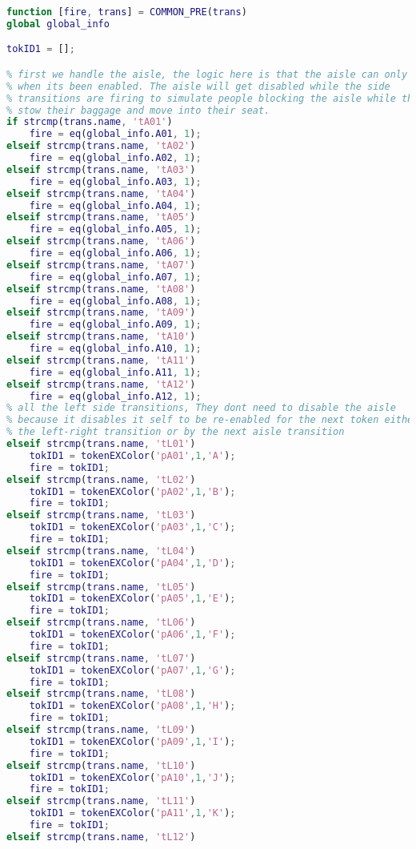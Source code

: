 \begin{lstlisting}[language=MATLAB, caption=COMMON\_PRE.m]
% COMMON_PRE.m
function [fire, trans] = COMMON_PRE(trans)
global global_info

tokID1 = [];

% first we handle the aisle, the logic here is that the aisle can only fire
% when its been enabled. The aisle will get disabled while the side
% transitions are firing to simulate people blocking the aisle while they
% stow their baggage and move into their seat.
if strcmp(trans.name, 'tA01')
    fire = eq(global_info.A01, 1);
elseif strcmp(trans.name, 'tA02')
    fire = eq(global_info.A02, 1);
elseif strcmp(trans.name, 'tA03')
    fire = eq(global_info.A03, 1);
elseif strcmp(trans.name, 'tA04')
    fire = eq(global_info.A04, 1);
elseif strcmp(trans.name, 'tA05')
    fire = eq(global_info.A05, 1);
elseif strcmp(trans.name, 'tA06')
    fire = eq(global_info.A06, 1);
elseif strcmp(trans.name, 'tA07')
    fire = eq(global_info.A07, 1);
elseif strcmp(trans.name, 'tA08')
    fire = eq(global_info.A08, 1);
elseif strcmp(trans.name, 'tA09')
    fire = eq(global_info.A09, 1);
elseif strcmp(trans.name, 'tA10')
    fire = eq(global_info.A10, 1);
elseif strcmp(trans.name, 'tA11')
    fire = eq(global_info.A11, 1);
elseif strcmp(trans.name, 'tA12')
    fire = eq(global_info.A12, 1);
% all the left side transitions, They dont need to disable the aisle
% because it disables it self to be re-enabled for the next token either by
% the left-right transition or by the next aisle transition
elseif strcmp(trans.name, 'tL01')
    tokID1 = tokenEXColor('pA01',1,'A');
    fire = tokID1;
elseif strcmp(trans.name, 'tL02')
    tokID1 = tokenEXColor('pA02',1,'B');
    fire = tokID1;
elseif strcmp(trans.name, 'tL03')
    tokID1 = tokenEXColor('pA03',1,'C');
    fire = tokID1;
elseif strcmp(trans.name, 'tL04')
    tokID1 = tokenEXColor('pA04',1,'D');
    fire = tokID1;
elseif strcmp(trans.name, 'tL05')
    tokID1 = tokenEXColor('pA05',1,'E');
    fire = tokID1;
elseif strcmp(trans.name, 'tL06')
    tokID1 = tokenEXColor('pA06',1,'F');
    fire = tokID1;
elseif strcmp(trans.name, 'tL07')
    tokID1 = tokenEXColor('pA07',1,'G');
    fire = tokID1;
elseif strcmp(trans.name, 'tL08')
    tokID1 = tokenEXColor('pA08',1,'H');
    fire = tokID1;
elseif strcmp(trans.name, 'tL09')
    tokID1 = tokenEXColor('pA09',1,'I');
    fire = tokID1;
elseif strcmp(trans.name, 'tL10')
    tokID1 = tokenEXColor('pA10',1,'J');
    fire = tokID1;
elseif strcmp(trans.name, 'tL11')
    tokID1 = tokenEXColor('pA11',1,'K');
    fire = tokID1;
elseif strcmp(trans.name, 'tL12')

\end{lstlisting}
